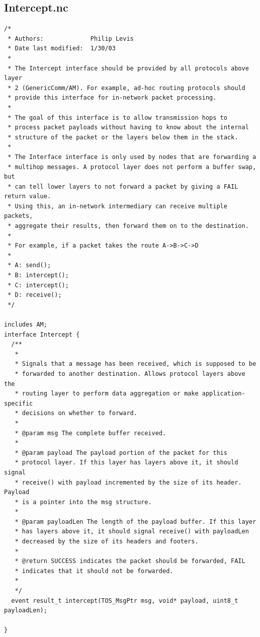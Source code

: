 \documentclass[10pt]{article}
\begin{document}
\subsection*{Intercept.nc}
\scriptsize
\begin{verbatim}
/*
 * Authors:             Philip Levis
 * Date last modified:  1/30/03
 *
 * The Intercept interface should be provided by all protocols above layer
 * 2 (GenericComm/AM). For example, ad-hoc routing protocols should
 * provide this interface for in-network packet processing.
 *
 * The goal of this interface is to allow transmission hops to
 * process packet payloads without having to know about the internal
 * structure of the packet or the layers below them in the stack.
 *
 * The Interface interface is only used by nodes that are forwarding a
 * multihop messages. A protocol layer does not perform a buffer swap, but
 * can tell lower layers to not forward a packet by giving a FAIL return value.
 * Using this, an in-network intermediary can receive multiple packets,
 * aggregate their results, then forward them on to the destination.
 *
 * For example, if a packet takes the route A->B->C->D
 *
 * A: send();
 * B: intercept();
 * C: intercept();
 * D: receive();
 */

includes AM;
interface Intercept {
  /**
   *
   * Signals that a message has been received, which is supposed to be
   * forwarded to another destination. Allows protocol layers above the
   * routing layer to perform data aggregation or make application-specific
   * decisions on whether to forward.
   *
   * @param msg The complete buffer received.
   *
   * @param payload The payload portion of the packet for this
   * protocol layer. If this layer has layers above it, it should signal
   * receive() with payload incremented by the size of its header. Payload
   * is a pointer into the msg structure.
   *
   * @param payloadLen The length of the payload buffer. If this layer
   * has layers above it, it should signal receive() with payloadLen
   * decreased by the size of its headers and footers.
   *
   * @return SUCCESS indicates the packet should be forwarded, FAIL
   * indicates that it should not be forwarded.
   *
   */
  event result_t intercept(TOS_MsgPtr msg, void* payload, uint8_t payloadLen);

}

\end{verbatim}
\normalsize
\end{document}
